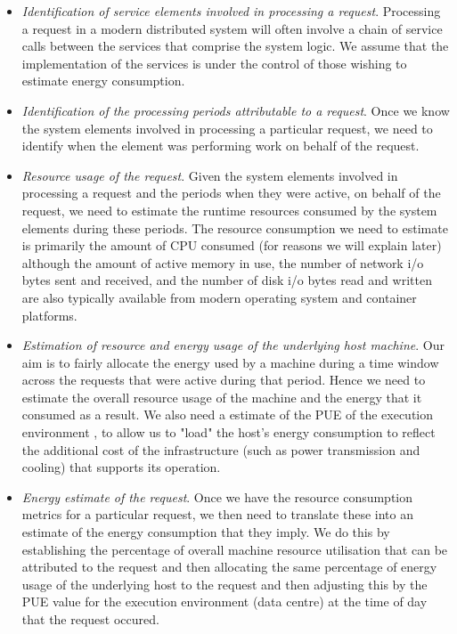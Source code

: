 \begin{itemize}

\item \emph{Identification of service elements involved in processing a request}.  Processing a request in a modern distributed system will often involve a chain of service calls between the services that comprise the system logic.  We assume that the implementation of the services is under the control of those wishing to estimate energy consumption.

\item \emph{Identification of the processing periods attributable to a request}.  Once we know the system elements involved in processing a particular request, we need to identify when the element was performing work on behalf of the request.

\item \emph{Resource usage of the request}.  Given the system elements involved in processing a request and the periods when they were active, on behalf of the request, we need to estimate the runtime resources consumed by the system elements during these periods.  The resource consumption we need to estimate is primarily the amount of CPU consumed (for reasons we will explain later) although the amount of active memory in use, the number of network i/o bytes sent and received, and the number of disk i/o bytes read and written are also typically available from modern operating system and container platforms.

\item \emph{Estimation of resource and energy usage of the underlying host machine}.  Our aim is to fairly allocate the energy used by a machine during a time window across the requests that were active during that period.  Hence we need to estimate the overall resource usage of the machine and the energy that it consumed as a result.  We also need a estimate of the PUE of the execution environment \cite{iso30134-pue}, to allow us to "load" the host's energy consumption to reflect the additional cost of the infrastructure (such as power transmission and cooling) that supports its operation.

\item \emph{Energy estimate of the request}.  Once we have the resource consumption metrics for a particular request, we then need to translate these into an estimate of the energy consumption that they imply.  We do this by establishing the percentage of overall machine resource utilisation that can be attributed to the request and then allocating the same percentage of energy usage of the underlying host to the request and then adjusting this by the PUE value for the execution environment (data centre) at the time of day that the request occured.

\end{itemize}


